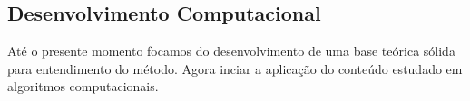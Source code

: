 \begin{frontmatter}
	\part{Desenvolvimento Computacional}\label{part2}
\end{frontmatter}

Até o presente momento focamos do desenvolvimento de  uma base teórica sólida para entendimento do método. Agora inciar a aplicação do conteúdo estudado em algoritmos computacionais.
